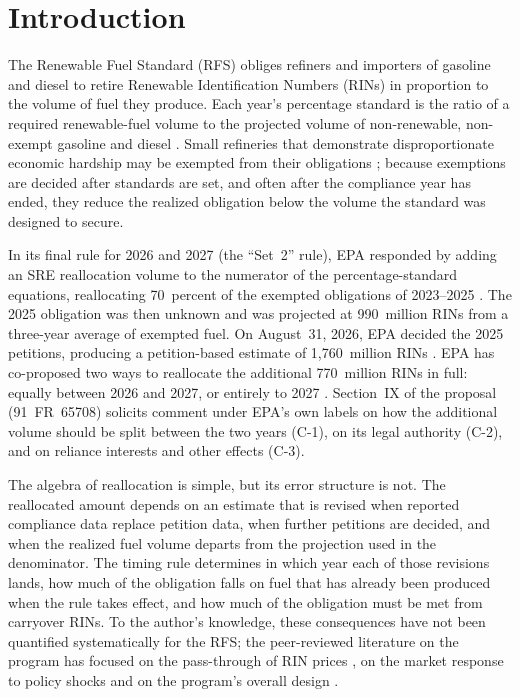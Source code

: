 \documentclass[preprint,12pt,authoryear]{elsarticle}
\begin{document}
\section{Introduction}

The Renewable Fuel Standard (RFS) obliges refiners and importers of gasoline and diesel to retire Renewable Identification Numbers (RINs) in proportion to the volume of fuel they produce. Each year's percentage standard is the ratio of a required renewable-fuel volume to the projected volume of non-renewable, non-exempt gasoline and diesel \citep{ecfr_80_1405}. Small refineries that demonstrate disproportionate economic hardship may be exempted from their obligations \citep{epa_sre_dashboard}; because exemptions are decided after standards are set, and often after the compliance year has ended, they reduce the realized obligation below the volume the standard was designed to secure.

In its final rule for 2026 and 2027 (the ``Set~2'' rule), EPA responded by adding an SRE reallocation volume to the numerator of the percentage-standard equations, reallocating 70~percent of the exempted obligations of 2023--2025 \citep{fr_2026_06275}. The 2025 obligation was then unknown and was projected at 990~million RINs from a three-year average of exempted fuel. On August~31, 2026, EPA decided the 2025 petitions, producing a petition-based estimate of 1,760~million RINs \citep{epa_420r26017}. EPA has co-proposed two ways to reallocate the additional 770~million RINs in full: equally between 2026 and 2027, or entirely to 2027 \citep{fr_2026_21155}. Section~IX of the proposal (91~FR~65708) solicits comment under EPA's own labels on how the additional volume should be split between the two years (C-1), on its legal authority (C-2), and on reliance interests and other effects (C-3).

The algebra of reallocation is simple, but its error structure is not. The reallocated amount depends on an estimate that is revised when reported compliance data replace petition data, when further petitions are decided, and when the realized fuel volume departs from the projection used in the denominator. The timing rule determines in which year each of those revisions lands, how much of the obligation falls on fuel that has already been produced when the rule takes effect, and how much of the obligation must be met from carryover RINs. To the author's knowledge, these consequences have not been quantified systematically for the RFS; the peer-reviewed literature on the program has focused on the pass-through of RIN prices \citep{knittel2017passthrough}, on the market response to policy shocks \citep{lade2018policyshocks} and on the program's overall design \citep{gerveni2026blueprint}.
\end{document}
